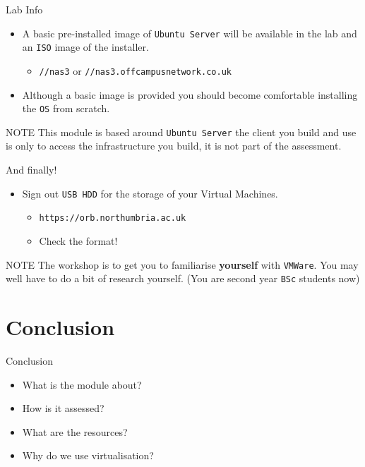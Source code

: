 \documentclass[aspectratio=169]{beamer}
\begin{document}
\begin{frame}{Lab Info}
  \begin{itemize}
    \item A basic pre-installed image of \texttt{Ubuntu Server} will be available in the lab and an \texttt{ISO} image of the installer. 
      \begin{itemize}
        \item \texttt{//nas3} or \texttt{//nas3.offcampusnetwork.co.uk} 
      \end{itemize}
    \item Although a basic image is provided you should become comfortable installing the \texttt{OS} from scratch.
  \end{itemize}
  \begin{block}{NOTE}
    This module is based around \texttt{Ubuntu Server} the client you build and use is only to access the infrastructure you build, it is not part of the assessment.
  \end{block}
\end{frame}

\begin{frame}{And finally!}
  \begin{itemize}
    \item Sign out \texttt{USB HDD} for the storage of your Virtual Machines.
      \begin{itemize}
        \item \texttt{https://orb.northumbria.ac.uk} 
        \item Check the format!
      \end{itemize}
  \end{itemize}
  \begin{block}{NOTE}
    The workshop is to get you to familiarise \textbf{yourself} with \texttt{VMWare}. You may well have to do a bit of research yourself. (You are second year \texttt{BSc} students now)
  \end{block}
\end{frame}



\section*{Conclusion}
\begin{frame}{Conclusion}
  \begin{itemize}
    \item What is the module about?
    \item How is it assessed?
    \item What are the resources?
    \item Why do we use virtualisation?
  \end{itemize}
\end{frame}
\end{document}
